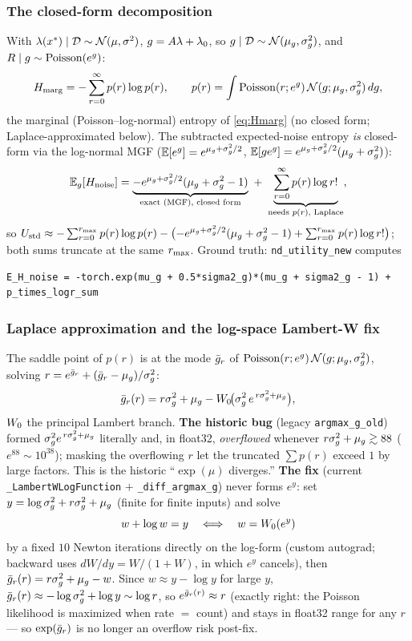 \subsubsection{The closed-form decomposition}
With $\lambda(x^*)\mid\mathcal{D}\sim\mathcal{N}(\mu,\sigma^{2})$, $g=A\lambda+\lambda_{0}$, so
$g\mid\mathcal{D}\sim\mathcal{N}(\mu_{g},\sigma_{g}^{2})$, and $R\mid g\sim\mathrm{Poisson}(e^{g})$:
\[
  H_{\mathrm{marg}}=-\sum_{r=0}^{\infty}p(r)\log p(r),\qquad p(r)=\int\mathrm{Poisson}(r;e^{g})\,\mathcal{N}(g;\mu_{g},\sigma_{g}^{2})\,dg,
\]
the marginal (Poisson--log-normal) entropy of \eqref{eq:Hmarg} (no closed form;
Laplace-approximated below). The subtracted expected-noise entropy \emph{is}
closed-form via the log-normal MGF ($\mathbb{E}[e^{g}]=e^{\mu_{g}+\sigma_{g}^{2}/2}$,
$\mathbb{E}[g e^{g}]=e^{\mu_{g}+\sigma_{g}^{2}/2}(\mu_{g}+\sigma_{g}^{2})$):
\begin{equation}\label{eq:Ehnoise}
  \mathbb{E}_{g}[H_{\mathrm{noise}}]=\underbrace{-e^{\mu_{g}+\sigma_{g}^{2}/2}(\mu_{g}+\sigma_{g}^{2}-1)}_{\text{exact (MGF), closed form}}\ +\ \underbrace{\sum_{r=0}^{\infty}p(r)\log r!}_{\text{needs }p(r)\text{, Laplace}} ,
\end{equation}
so $U_{\mathrm{std}}\approx-\sum_{r=0}^{r_{\max}}p(r)\log p(r)-\bigl(-e^{\mu_{g}+\sigma_{g}^{2}/2}(\mu_{g}+\sigma_{g}^{2}-1)+\sum_{r=0}^{r_{\max}}p(r)\log r!\bigr)$;
both sums truncate at the same $r_{\max}$. Ground truth: \texttt{nd\_\allowbreak utility\_\allowbreak new}
computes
\begin{lstlisting}
E_H_noise = -torch.exp(mu_g + 0.5*sigma2_g)*(mu_g + sigma2_g - 1) + p_times_logr_sum
\end{lstlisting}

\subsubsection{Laplace approximation and the log-space Lambert-W fix}
The saddle point of $p(r)$ is at the mode $\bar{g}_{r}$ of
$\mathrm{Poisson}(r;e^{g})\,\mathcal{N}(g;\mu_{g},\sigma_{g}^{2})$, solving $r=e^{\bar{g}_{r}}+(\bar{g}_{r}-\mu_{g})/\sigma_{g}^{2}$:
\begin{equation}\label{eq:lambertmode}
  \bar{g}_{r}(r)=r\sigma_{g}^{2}+\mu_{g}-W_{0}\!\bigl(\sigma_{g}^{2}\,e^{\,r\sigma_{g}^{2}+\mu_{g}}\bigr),
\end{equation}
$W_{0}$ the principal Lambert branch. \textbf{The historic bug} (legacy
\texttt{argmax\_\allowbreak g\_\allowbreak old}) formed $\sigma_{g}^{2} e^{\,r\sigma_{g}^{2}+\mu_{g}}$ literally and, in float32,
\emph{overflowed} whenever $r\sigma_{g}^{2}+\mu_{g}\gtrsim88$ ($e^{88}\sim10^{38}$); masking the
overflowing $r$ let the truncated $\sum p(r)$ exceed $1$ by large factors. This is
the historic ``$\exp(\mu)$ diverges.'' \textbf{The fix} (current
\texttt{\_\allowbreak LambertWLogFunction} $+$ \texttt{\_\allowbreak diff\_\allowbreak argmax\_\allowbreak g}) never forms $e^y$:
set $y=\log\sigma_{g}^{2}+r\sigma_{g}^{2}+\mu_{g}$ (finite for finite inputs) and solve
\[
  w+\log w=y\quad\Longleftrightarrow\quad w=W_{0}(e^y)
\]
by a fixed $10$ Newton iterations directly on the log-form (custom autograd;
backward uses $dW/dy=W/(1+W)$, in which $e^y$ cancels), then
$\bar{g}_{r}(r)=r\sigma_{g}^{2}+\mu_{g}-w$. Since $w\approx y-\log y$ for large $y$,
$\bar{g}_{r}(r)\approx-\log\sigma_{g}^{2}+\log y\sim\log r$, so $e^{\bar{g}_{r}(r)}\approx r$ (exactly
right: the Poisson likelihood is maximized when rate $=$ count) and stays in
float32 range for any $r$ --- so $\exp(\bar{g}_{r})$ is no longer an overflow risk
post-fix.

